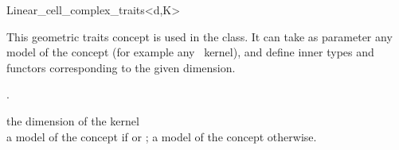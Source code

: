 \ccRefPageBegin

\begin{ccRefClass}{Linear_cell_complex_traits<d,K>}


\ccDefinition

This geometric traits concept is used in the
 class.  It can take as parameter any model of the
concept  (for example any \cgal\ kernel), and define inner
types and functors corresponding to the given dimension.

\ccIsModel
{}

\ccInheritsFrom
{}.

\ccParameters
{} the dimension of the kernel\\
 a model of the concept  if  or 
 ; a model of the concept  otherwise. 

\ccConstants
{}


\ccSeeAlso

\\

\end{ccRefClass}
\ccRefPageEnd





